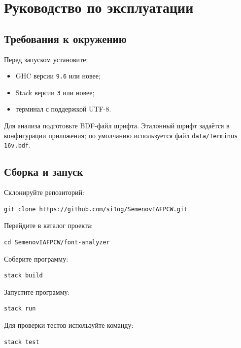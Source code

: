 \section{Руководство по эксплуатации}
\label{sec:manual}

\subsection{Требования к окружению}

Перед запуском установите:

\begin{itemize}
    \item GHC версии \texttt{9.6} или новее;
    \item Stack версии \texttt{3} или новее;
    \item терминал с поддержкой UTF-8.
\end{itemize}

Для анализа подготовьте BDF-файл шрифта. Эталонный шрифт задаётся в конфигурации приложения; по умолчанию используется файл \texttt{data/Terminus 16v.bdf}.

\subsection{Сборка и запуск}

Склонируйте репозиторий:

\begin{verbatim}
git clone https://github.com/si1og/SemenovIAFPCW.git
\end{verbatim}

Перейдите в каталог проекта:

\begin{verbatim}
cd SemenovIAFPCW/font-analyzer
\end{verbatim}

Соберите программу:

\begin{verbatim}
stack build
\end{verbatim}

Запустите программу:

\begin{verbatim}
stack run
\end{verbatim}

Для проверки тестов используйте команду:

\begin{verbatim}
stack test
\end{verbatim}

